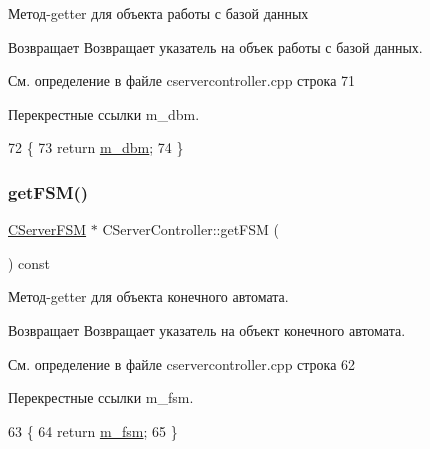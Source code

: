Метод-\/getter для объекта работы с базой данных 

\begin{DoxyReturn}{Возвращает}
Возвращает указатель на объек работы с базой данных. 
\end{DoxyReturn}


См. определение в файле cservercontroller.\+cpp строка 71



Перекрестные ссылки m\+\_\+dbm.


\begin{DoxyCode}
72 \{
73     \textcolor{keywordflow}{return} \hyperlink{class_c_server_controller_ab147bebeb63fe45d845090f0a4750582}{m\_dbm};
74 \}
\end{DoxyCode}
\hypertarget{class_c_server_controller_ade77d98a3358e5b1914ebbffa7d810ce}{}\label{class_c_server_controller_ade77d98a3358e5b1914ebbffa7d810ce} 
\subsubsection{\texorpdfstring{get\+F\+S\+M()}{getFSM()}}
{\footnotesize\ttfamily \hyperlink{class_c_server_f_s_m}{C\+Server\+F\+SM} $\ast$ C\+Server\+Controller\+::get\+F\+SM (\begin{DoxyParamCaption}{ }\end{DoxyParamCaption}) const}



Метод-\/getter для объекта конечного автомата. 

\begin{DoxyReturn}{Возвращает}
Возвращает указатель на объект конечного автомата. 
\end{DoxyReturn}


См. определение в файле cservercontroller.\+cpp строка 62



Перекрестные ссылки m\+\_\+fsm.


\begin{DoxyCode}
63 \{
64     \textcolor{keywordflow}{return} \hyperlink{class_c_server_controller_a3282dabaabac03bdb3447001c186a97f}{m\_fsm};
65 \}
\end{DoxyCode}
\hypertarget{class_c_server_controller_a9934f4eb54e1e1debd1aa6fd5e036012}{}\label{class_c_server_controller_a9934f4eb54e1e1debd1aa6fd5e036012} 
